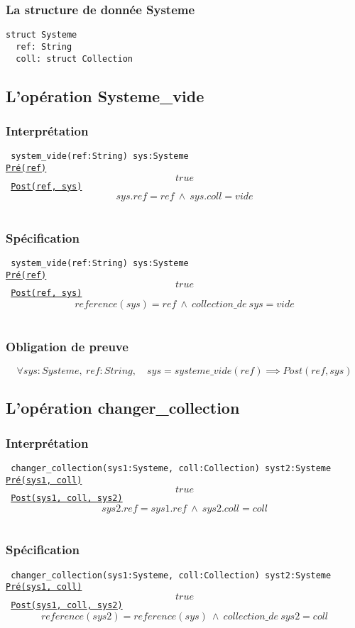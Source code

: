 \documentclass{article}
\begin{document}
\subsubsection{La structure de donnée Systeme}
\begin{verbatim}
struct Systeme
  ref: String
  coll: struct Collection
\end{verbatim}

\subsection{L'opération Systeme\_vide}
\subsubsection{Interprétation}
{\tt
system\_vide(ref:String) sys:Systeme\\
\underline{Pré(ref)}
$$ true $$
\underline{Post(ref, sys)}
$$ sys.ref = ref\ \wedge\ sys.coll = vide $$
}

\subsubsection{Spécification}
{\tt
system\_vide(ref:String) sys:Systeme\\
\underline{Pré(ref)}
$$ true $$
\underline{Post(ref, sys)}
$$ reference(sys) = ref\ \wedge\ collection\_de\ sys = vide $$
}

\subsubsection{Obligation de preuve}
$$ \forall sys:Systeme,\ ref:String,\quad sys = systeme\_vide(ref) \implies Post(ref, sys) $$

\subsection{L'opération changer\_collection}
\subsubsection{Interprétation}
{\tt
changer\_collection(sys1:Systeme, coll:Collection) syst2:Systeme\\
\underline{Pré(sys1, coll)}
$$ true $$
\underline{Post(sys1, coll, sys2)}
$$ sys2.ref = sys1.ref\ \wedge\ sys2.coll = coll $$
}

\subsubsection{Spécification}
{\tt
changer\_collection(sys1:Systeme, coll:Collection) syst2:Systeme\\
\underline{Pré(sys1, coll)}
$$ true $$
\underline{Post(sys1, coll, sys2)}
$$ reference(sys2) = reference(sys)\ \wedge\ collection\_de\ sys2 = coll $$
}
\end{document}
